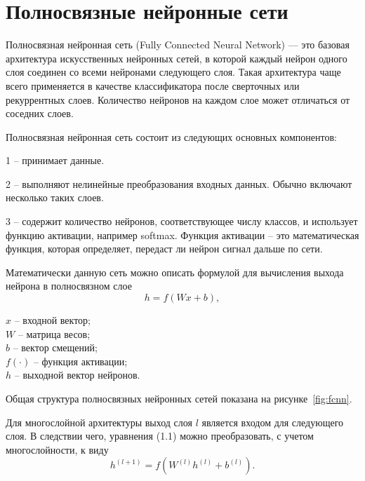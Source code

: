 \section{Полносвязные нейронные сети}\par
\hspace*{12.5 mm}Полносвязная нейронная сеть (Fully Connected Neural Network) — 
это базовая архитектура искусственных нейронных сетей, в которой каждый нейрон 
одного слоя соединен со всеми нейронами следующего слоя. Такая архитектура
чаще всего применяется в качестве классификатора после сверточных или 
рекуррентных слоев. Количество нейронов на каждом слое может отличаться от 
соседних слоев.

\anonsection{}Полносвязная нейронная сеть состоит из следующих основных 
компонентов:

    1  – принимает данные.

    2  – выполняют нелинейные преобразования входных данных. 
    Обычно включают несколько таких слоев.

    3  – содержит количество нейронов, соответствующее 
    числу классов, и использует функцию активации, 
    например softmax. Функция активации – это математическая функция, которая 
    определяет, передаст ли нейрон сигнал дальше по сети.

Математически данную сеть можно описать формулой для вычисления выхода нейрона 
в полносвязном слое
\begin{equation}
    {h} = f({W} {x} + {b}),
\end{equation}

   ${x}$ – входной вектор;\\
\hphantom{где} ${W}$ – матрица весов;\\
\hphantom{где} ${b}$ – вектор смещений;\\
\hphantom{где} $f(\cdot)$ – функция активации;\\
\hphantom{где} ${h}$ – выходной вектор нейронов.

Общая структура полносвязных нейронных сетей показана на 
рисунке~\ref{fig:fcnn}.


Для многослойной архитектуры выход слоя $l$ является входом для следующего слоя. 
В следствии чего, уравнения (1.1) можно преобразовать, с учетом многослойности, 
к виду
\begin{equation}
    {h}^{(l+1)} = f({W}^{(l)} {h}^{(l)} + {b}^{(l)}).
\end{equation}

